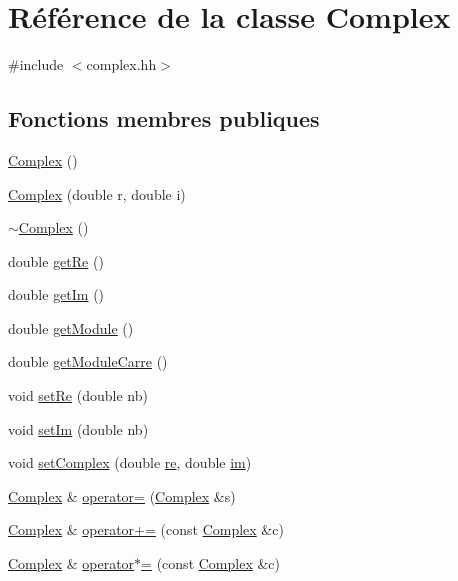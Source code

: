 \hypertarget{classComplex}{}\section{Référence de la classe Complex}
\label{classComplex}


{\ttfamily \#include $<$complex.\+hh$>$}

\subsection*{Fonctions membres publiques}
\begin{DoxyCompactItemize}
\item 
\hyperlink{classComplex_a43b9f07cdf697c71b5fd506a6cc80b8f}{Complex} ()
\item 
\hyperlink{classComplex_af56593c9b976452fd1480c1cc9e7a8c7}{Complex} (double r, double i)
\item 
\hyperlink{classComplex_a70e14b17c92e3da779686b98f9f3bb2d}{$\sim$\+Complex} ()
\item 
double \hyperlink{classComplex_a5e43de61a58eab8420b70eb2974e6b0b}{get\+Re} ()
\item 
double \hyperlink{classComplex_adb777696a6536bae109ce0b1380493cb}{get\+Im} ()
\item 
double \hyperlink{classComplex_a5d7b502023f614df92f597f65b081de0}{get\+Module} ()
\item 
double \hyperlink{classComplex_a6d0e1c55b4986f03850adaace198824e}{get\+Module\+Carre} ()
\item 
void \hyperlink{classComplex_abb500a2eaeb93c489fbc38506fdd0750}{set\+Re} (double nb)
\item 
void \hyperlink{classComplex_aac52bfc17e87be68433b2bca83bb96f0}{set\+Im} (double nb)
\item 
void \hyperlink{classComplex_a6a8847542b73f8af12ae3c1f51fec64f}{set\+Complex} (double \hyperlink{classComplex_a843ce2f85af4c57db9063c86f3cd9607}{re}, double \hyperlink{classComplex_a776d595d5a1b576e9136cbc6bac0589c}{im})
\item 
\hyperlink{classComplex}{Complex} \& \hyperlink{classComplex_a77d1c64c8a3e4fe5d7c3e9ffcd666c7e}{operator=} (\hyperlink{classComplex}{Complex} \&s)
\item 
\hyperlink{classComplex}{Complex} \& \hyperlink{classComplex_ae567e20c39745c1bfe8f07be126a5fff}{operator+=} (const \hyperlink{classComplex}{Complex} \&c)
\item 
\hyperlink{classComplex}{Complex} \& \hyperlink{classComplex_a2f5beb61c61de440c20e69decc584952}{operator$\ast$=} (const \hyperlink{classComplex}{Complex} \&c)
\end{DoxyCompactItemize}
